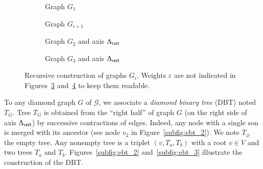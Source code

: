 \documentclass[preprint]{elsarticle}
\newcommand{\set}[1]{\left\{ #1 \right\}}
\newcommand{\card}[1]{\left| #1 \right|}
\newcommand{\mcalg}{\mathcal{G}}
\newcommand{\mts}{MS}
\newcommand{\deltavert}{\Delta_{\mbox{\scriptsize{vert}}}}
\newcommand{\ebt}{DBT}
\begin{document}
\begin{figure}[h]
\centering
\begin{subfigure}[b]{0.49\columnwidth}
\centering
\scalebox{.52}{}
\caption{Graph $G_1$}
\label{subfig:G_1}
\end{subfigure}
\begin{subfigure}[b]{0.49\columnwidth}
\centering
\scalebox{.52}{}
\caption{Graph $G_{i+1}$}
\label{subfig:G_i}
\end{subfigure}
\begin{subfigure}[b]{0.49\columnwidth}
\centering
\scalebox{.45}{}
\caption{Graph $G_2$ and axis $\deltavert$}
\label{subfig:G_2}
\end{subfigure}
\begin{subfigure}[b]{0.49\columnwidth}
\centering
\scalebox{0.45}{}
\caption{Graph $G_3$ and axis $\deltavert$}
\label{subfig:G_3}
\end{subfigure}
\caption{Recursive construction of graphs $G_i$. Weights $\varepsilon$ are not indicated in Figures~\ref{subfig:G_2} and~\ref{subfig:G_3} to keep them readable.}
\label{fig:G_i}
\end{figure}

%

To any diamond graph $G$ of $\mcalg$, we associate a \textit{diamond binary tree} (\ebt ) noted $T_G$. Tree $T_G$ is obtained from the “right half” of graph $G$ (on the right side of axis $\deltavert$) by successive contractions of edges. Indeed, any node with a single son is merged with its ancestor (see node $v_2$ in Figure~\ref{subfig:ebt_2}). 
We note $T_\varnothing$ the empty tree. Any nonempty tree is a triplet $(v, T_a, T_b)$ with a root $v \in V$ and two trees $T_a$ and $T_b$. Figures~\ref{subfig:ebt_2} and~\ref{subfig:ebt_3} illustrate the construction of the \ebt . 
\end{document}
